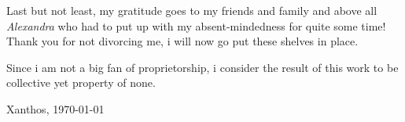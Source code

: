 Last but not least, my gratitude goes to my friends and family and above all \emph{Alexandra} 
who had to put up with my absent-mindedness for quite some time! Thank you for not 
divorcing me, i will now go put these shelves in place.

Since i am not a big fan of proprietorship, i consider the result of this work to 
be collective yet property of none.
\par
\begin{flushright}
  Xanthos, \today\par
\end{flushright}
\vfill
